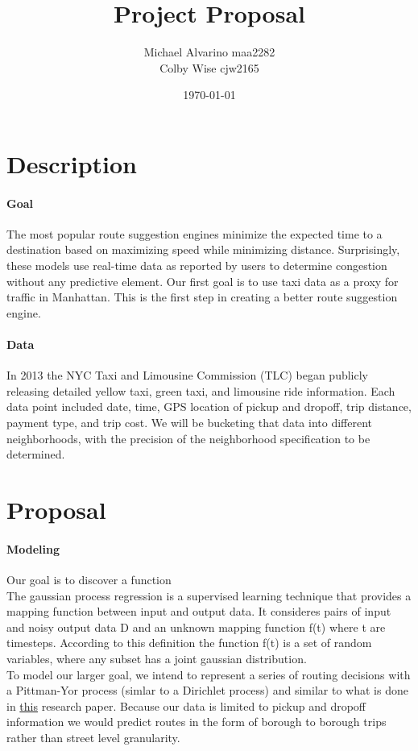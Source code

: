 \documentclass{article}
\begin{document}
\title{\textbf{Project Proposal}}
\date{\today}
\author{
Michael Alvarino maa2282\\
Colby Wise cjw2165
}

\maketitle

\section{Description}

\paragraph{Goal} The most popular route suggestion engines minimize the expected time to a destination based on maximizing speed while minimizing distance. Surprisingly, these models use real-time data as reported by users to determine congestion without any predictive element. Our first goal is to use taxi data as a proxy for traffic in Manhattan. This is the first step in creating a better route suggestion engine.

\paragraph{Data} In 2013 the NYC Taxi and Limousine Commission (TLC) began publicly releasing detailed yellow taxi, green taxi, and limousine ride information. Each data point included date, time, GPS location of pickup and dropoff, trip distance, payment type, and trip cost. We will be bucketing that data into different neighborhoods, with the precision of the neighborhood specification to be determined.

\section{Proposal}

\paragraph{Modeling}

Our goal is to discover a function \\
The gaussian process regression is a supervised learning technique that provides a mapping function between input and output data. It consideres pairs of input and noisy output data D and an unknown mapping function f(t) where t are timesteps. According to this definition the function f(t) is a set of random variables, where any subset has a joint gaussian distribution. \\
To model our larger goal, we intend to represent a series of routing decisions with a Pittman-Yor process (simlar to a Dirichlet process) and similar to what is done in \href{http://web.mit.edu/jaillet/www/general/IAT2012.pdf}{this} research paper. Because our data is limited to pickup and dropoff information we would predict routes in the form of borough to borough trips rather than street level granularity.
\end{document}
